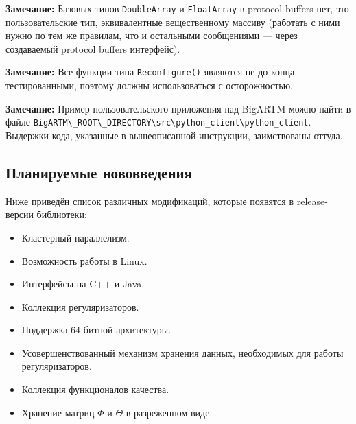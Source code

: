 {\bf Замечание:} Базовых типов \verb'DoubleArray' и \verb'FloatArray' в protocol buffers нет, это пользовательские тип, эквивалентные вещественному массиву (работать с ними нужно по тем же правилам, что и остальными сообщениями --- через создаваемый protocol buffers интерфейс).

{\bf Замечание:} Все функции типа \verb|Reconfigure()| являются не до конца тестированными, поэтому должны использоваться с осторожностью.

{\bf Замечание:} Пример пользовательского приложения над BigARTM можно найти в файле \verb|BigARTM\_ROOT\_DIRECTORY\src\python_client\python_client|. Выдержки кода, указанные в вышеописанной инструкции, заимствованы оттуда.

\subsection{Планируемые нововведения}

Ниже приведён список различных модификаций, которые появятся в release-версии библиотеки:

\begin{itemize}
	\item Кластерный параллелизм.
	\item Возможность работы в Linux.
	\item Интерфейсы на C++ и Java.
	\item Коллекция регуляризаторов.
	\item Поддержка 64-битной архитектуры.
	\item Усовершенствованный механизм хранения данных, необходимых для работы регуляризаторов.
	\item Коллекция функционалов качества.
	\item Хранение матриц $\Phi$ и $\Theta$ в разреженном виде.
\end{itemize}